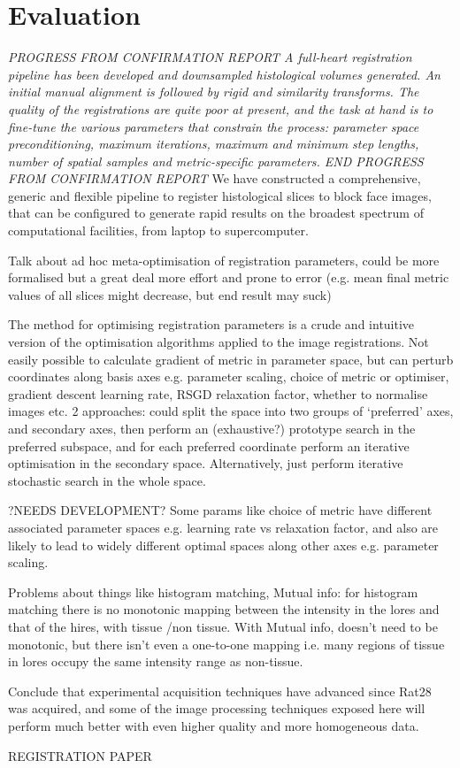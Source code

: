 \section{Evaluation} %
\label{sec:evaluation}

\textit{PROGRESS FROM CONFIRMATION REPORT 
A full-heart registration pipeline has been developed and downsampled histological volumes generated. An initial manual alignment is followed by rigid and similarity transforms. The quality of the registrations are quite poor at present, and the task at hand is to fine-tune the various parameters that constrain the process: parameter space preconditioning, maximum iterations, maximum and minimum step lengths, number of spatial samples and metric-specific parameters.
END PROGRESS FROM CONFIRMATION REPORT
}
    We have constructed a comprehensive, generic and flexible pipeline to register histological slices to block face images, that can be configured to generate rapid results on the broadest spectrum of computational facilities, from laptop to supercomputer.
    
    Talk about ad hoc meta-optimisation of registration parameters, could be more formalised but a great deal more effort and prone to error (e.g. mean final metric values of all slices might decrease, but end result may suck)
    
    The method for optimising registration parameters is a crude and intuitive version of the optimisation algorithms applied to the image registrations. Not easily possible to calculate gradient of metric in parameter space, but can perturb coordinates along basis axes e.g. parameter scaling, choice of metric or optimiser, gradient descent learning rate, RSGD relaxation factor, whether to normalise images etc. 2 approaches: could split the space into two groups of `preferred' axes, and secondary axes, then perform an (exhaustive?) prototype search in the preferred subspace, and for each preferred coordinate perform an iterative optimisation in the secondary space. Alternatively, just perform iterative stochastic search in the whole space.
    
    ?NEEDS DEVELOPMENT? Some params like choice of metric have different associated parameter spaces e.g. learning rate vs relaxation factor, and also are likely to lead to widely different optimal spaces along other axes e.g. parameter scaling.
    
    Problems about things like histogram matching, Mutual info: for histogram matching there is no monotonic mapping between the intensity in the lores and that of the hires, with tissue /non tissue. With Mutual info, doesn't need to be monotonic, but there isn't even a one-to-one mapping i.e. many regions of tissue in lores occupy the same intensity range as non-tissue.
    
    Conclude that experimental acquisition techniques have advanced since Rat28 was acquired, and some of the image processing techniques exposed here will perform much better with even higher quality and more homogeneous data.
    

REGISTRATION PAPER

% 
% 
  